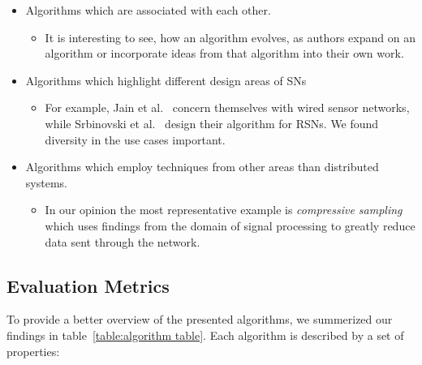 \begin{itemize}
    \item Algorithms which are associated with each other.
    \begin{itemize}
        \item It is interesting to see, how an algorithm evolves, as
        authors expand on an algorithm or incorporate ideas from that
        algorithm into their own work.
    \end{itemize}
    \item Algorithms which highlight different design areas of \acp{SN}
    \begin{itemize}
        \item For example, Jain et al.~\cite{jain2004adaptive} concern
        themselves with wired sensor networks, while Srbinovski et
        al.~\cite{srbinovski2016energy} design their algorithm for
        \acp{RSN}. We found diversity in the use cases important.
    \end{itemize}
    \item Algorithms which employ techniques from other areas than
    distributed systems. 
    \begin{itemize}
        \item In our opinion the most representative example is
        \textit{compressive sampling} which uses findings from the
        domain of signal processing to greatly reduce data sent through
        the network.
    \end{itemize}
\end{itemize}

\subsection{Evaluation Metrics}
\label{sec:Evaluation Metrics}

To provide a better overview of the presented algorithms, we summerized our
findings in table~\ref{table:algorithm table}. Each algorithm is described by a set
of properties:


